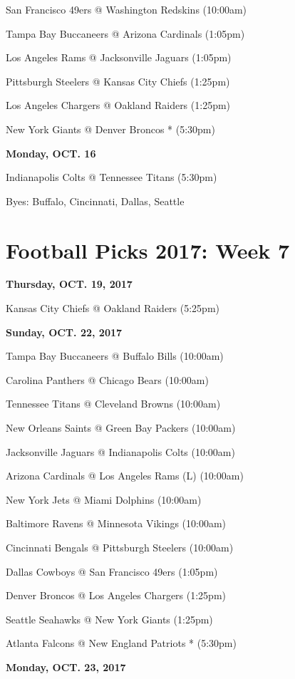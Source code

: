 \documentclass[11pt, letterpaper]{article}
\begin{document}
San Francisco 49ers @ Washington Redskins (10:00am)\par
Tampa Bay Buccaneers @ Arizona Cardinals (1:05pm)\par
Los Angeles Rams @ Jacksonville Jaguars (1:05pm)\par
Pittsburgh Steelers @ Kansas City Chiefs (1:25pm)\par
Los Angeles Chargers @ Oakland Raiders (1:25pm)\par
New York Giants @ Denver Broncos * (5:30pm)\par
\noindent \normalsize \textbf{Monday, OCT. 16} \par
Indianapolis Colts @ Tennessee Titans (5:30pm)\par
\vfill{}
Byes:  Buffalo,  Cincinnati,  Dallas, 
                      Seattle
\newpage \section*{\LARGE Football Picks 2017: Week 7}
\noindent \normalsize \textbf{Thursday, OCT.    19, 2017} \par
Kansas City Chiefs @ Oakland Raiders (5:25pm)\par
\noindent \normalsize \textbf{Sunday, OCT. 22, 2017} \par
Tampa Bay Buccaneers @ Buffalo Bills (10:00am)\par
Carolina Panthers @ Chicago Bears (10:00am)\par
Tennessee Titans @ Cleveland Browns (10:00am)\par
New Orleans Saints @ Green Bay Packers (10:00am)\par
Jacksonville Jaguars @ Indianapolis Colts (10:00am)\par
Arizona Cardinals @ Los Angeles Rams (L) (10:00am)\par
New York Jets @ Miami Dolphins (10:00am)\par
Baltimore Ravens @ Minnesota Vikings (10:00am)\par
Cincinnati Bengals @ Pittsburgh Steelers (10:00am)\par
Dallas Cowboys @ San Francisco 49ers (1:05pm)\par
Denver Broncos @ Los Angeles Chargers (1:25pm)\par
Seattle Seahawks @ New York Giants (1:25pm)\par
Atlanta Falcons @ New England Patriots * (5:30pm)\par
\noindent \normalsize \textbf{Monday, OCT. 23, 2017} \par
\end{document}
